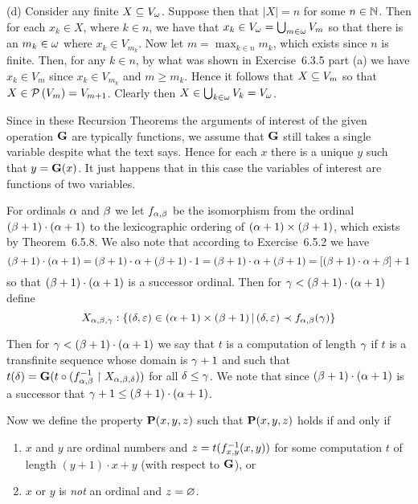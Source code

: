 \begin{solution}
    (d) Consider any finite $X \ss V_\w$.
    Suppose then that $|X| = n$ for some $n \in \nats$.
    Then for each $x_k \in X$, where $k \in n$, we have that $x_k \in V_\w = \bigcup_{m \in \w} V_m$ so that there is an $m_k \in \w$ where $x_k \in V_{m_k}$.
    Now let $m = \max_{k \in n} m_k$, which exists since $n$ is finite.
    Then, for any $k \in n$, by what was shown in Exercise~6.3.5 part (a) we have $x_k \in V_m$ since $x_k \in V_{m_k}$ and $m \geq m_k$.
    Hence it follows that $X \ss V_m$ so that $X \in \pset{V_m} = V_{m+1}$.
    Clearly then $X \in \bigcup_{k \in \w} V_k = V_\w$. \qedsymbol
\end{solution}


\begin{solution}
    \def\P{\prop{P}}
    \def\G{\prop{G}}
    \def\R{\prop{R}}
    \def\F{\prop{F}}
    Since in these Recursion Theorems the arguments of interest of the given operation $\G$ are typically functions, we assume that $\G$ still takes a single variable despite what the text says.
    Hence for each $x$ there is a unique $y$ such that $y = \G(x)$.
    It just happens that in this case the variables of interest are functions of two variables.

    For ordinals $\a$ and $\b$ we let $f_{\a,\b}$ be the isomorphism from the ordinal $(\b+1)\cdot(\a+1)$ to the lexicographic ordering of $(\a+1) \times (\b+1)$, which exists by Theorem~6.5.8.
    We also note that  according to Exercise~6.5.2 we have
    $$
    (\b+1)\cdot(\a+1) = (\b+1)\cdot\a + (\b+1)\cdot 1 = (\b+1)\cdot\a + (\b+1) = \squares{(\b+1)\cdot\a + \b} + 1
    $$
    so that $(\b+1)\cdot(\a+1)$ is a successor ordinal.
    Then for $\g < (\b+1)\cdot(\a+1)$ define
    $$
    X_{\a,\b,\g} : \braces{(\d,\e) \in (\a+1) \times (\b+1) \where (\d,\e) \prec f_{\a,\b}(\g)}
    $$

    Then for $\g < (\b+1) \cdot (\a+1)$ we say that $t$ is a computation of length $\g$ if $t$ is a transfinite sequence whose domain is $\g+1$ and such that $t(\d) = \G(t \circ (\inv{f_{\a,\b}} \rest X_{\a,\b,\d}))$ for all $\d \leq \g$.
    We note that since $(\b+1)\cdot(\a+1)$ is a successor that $\g+1 \leq (\b+1)\cdot(\a+1)$.

    Now we define the property $\P(x,y,z)$ such that $\P(x,y,z)$ holds if and only if
    \begin{enumerate}
        \item $x$ and $y$ are ordinal numbers and $z = t(\inv{f_{x,y}}(x,y))$ for some computation $t$ of length $(y+1)\cdot x + y$ (with respect to $\G$), or
        \item $x$ or $y$ is \emph{not} an ordinal and $z = \es$.
    \end{enumerate}


\end{solution}
